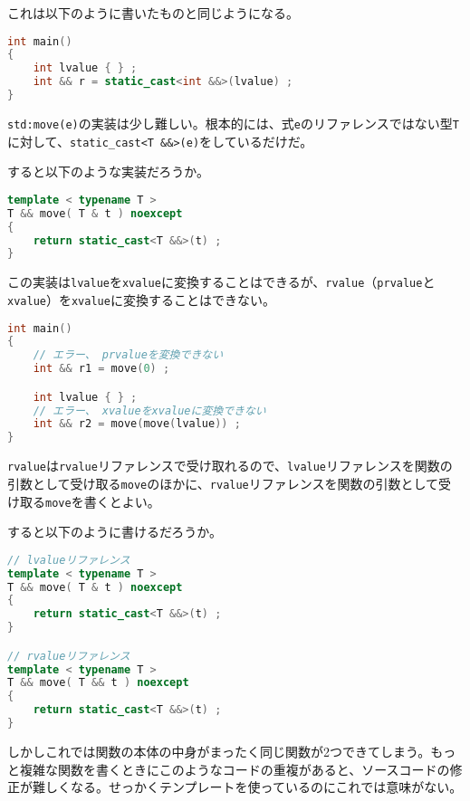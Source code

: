これは以下のように書いたものと同じようになる。

\begin{lstlisting}[language={C++}]
int main()
{
    int lvalue { } ;
    int && r = static_cast<int &&>(lvalue) ;
}
\end{lstlisting}


\texttt{std:move(e)}の実装は少し難しい。根本的には、式\texttt{e}のリファレンスではない型\texttt{T}に対して、\texttt{static\_cast<T \&\&>(e)}をしているだけだ。

すると以下のような実装だろうか。

\begin{lstlisting}[language={C++}]
template < typename T >
T && move( T & t ) noexcept
{
    return static_cast<T &&>(t) ;
}
\end{lstlisting}

この実装は\texttt{lvalue}を\texttt{xvalue}に変換することはできるが、\texttt{rvalue}（\texttt{prvalue}と\texttt{xvalue}）を\texttt{xvalue}に変換することはできない。

\begin{lstlisting}[language={C++}]
int main()
{
    // エラー、 prvalueを変換できない
    int && r1 = move(0) ;

    int lvalue { } ;
    // エラー、 xvalueをxvalueに変換できない
    int && r2 = move(move(lvalue)) ;
}
\end{lstlisting}

\texttt{rvalue}は\texttt{rvalue}リファレンスで受け取れるので、\texttt{lvalue}リファレンスを関数の引数として受け取る\texttt{move}のほかに、\texttt{rvalue}リファレンスを関数の引数として受け取る\texttt{move}を書くとよい。

すると以下のように書けるだろうか。

\begin{lstlisting}[language={C++}]
// lvalueリファレンス
template < typename T >
T && move( T & t ) noexcept
{
    return static_cast<T &&>(t) ;
}

// rvalueリファレンス
template < typename T >
T && move( T && t ) noexcept
{
    return static_cast<T &&>(t) ;
}
\end{lstlisting}

しかしこれでは関数の本体の中身がまったく同じ関数が2つできてしまう。もっと複雑な関数を書くときにこのようなコードの重複があると、ソースコードの修正が難しくなる。せっかくテンプレートを使っているのにこれでは意味がない。

